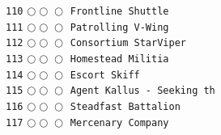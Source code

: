 \documentclass[a4paper,landscape]{article}
\begin{document}
\begin{multicols*}{5}
\texttt{110} \(\bigcirc\!\bigcirc\!\bigcirc\)  \texttt{Frontline Shuttle} \vspace{-0.3mm}\\ 
\texttt{111} \(\bigcirc\!\bigcirc\!\bigcirc\)  \texttt{Patrolling V-Wing} \vspace{-0.3mm}\\ 
\texttt{112} \(\bigcirc\!\bigcirc\!\bigcirc\)  \texttt{Consortium StarViper} \vspace{-0.3mm}\\ 
\texttt{113} \(\bigcirc\!\bigcirc\!\bigcirc\)  \texttt{Homestead Militia} \vspace{-0.3mm}\\ 
\texttt{114} \(\bigcirc\!\bigcirc\!\bigcirc\)  \texttt{Escort Skiff} \vspace{-0.3mm}\\ 
\texttt{115} \(\bigcirc\!\bigcirc\!\bigcirc\)  \texttt{Agent Kallus - Seeking th} \vspace{-0.3mm}\\ 
\texttt{116} \(\bigcirc\!\bigcirc\!\bigcirc\)  \texttt{Steadfast Battalion} \vspace{-0.3mm}\\ 
\texttt{117} \(\bigcirc\!\bigcirc\!\bigcirc\)  \texttt{Mercenary Company} \vspace{-0.3mm}\\ 

\end{multicols*}
\end{document}
